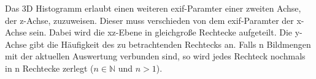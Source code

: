 \begin{description}
			\begin{figure}[H]
				\centering
			\end{figure}
			Das 3D Histogramm erlaubt einen weiteren \gls{exif}-Paramter einer zweiten Achse, der z-Achse, zuzuweisen. Dieser muss verschieden von dem \gls{exif}-Paramter der x-Achse sein.
			Dabei wird die xz-Ebene in gleichgroße Rechtecke aufgeteilt. Die y-Achse gibt die Häufigkeit des zu betrachtenden Rechtecks an. Falls n Bildmengen mit der aktuellen Auswertung verbunden sind, so wird jedes Rechteck nochmals in n Rechtecke zerlegt ($ n \in \mathbb{N} $ und $ n>1 $). \par
			

\end{description}
